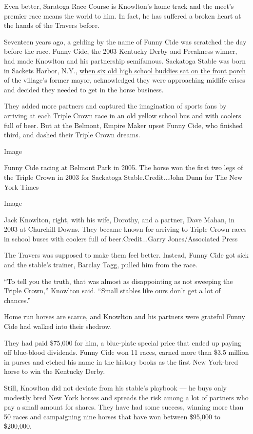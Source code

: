 Even better, Saratoga Race Course is Knowlton's home track and the
meet's premier race means the world to him. In fact, he has suffered a
broken heart at the hands of the Travers before.

Seventeen years ago, a gelding by the name of Funny Cide was scratched
the day before the race. Funny Cide, the 2003 Kentucky Derby and
Preakness winner, had made Knowlton and his partnership semifamous.
Sackatoga Stable was born in Sackets Harbor, N.Y.,
\href{https://www.nytimes.com/2003/06/02/sports/horse-racing-hicks-from-sticks-now-racing-s-elite.html}{when
six old high school buddies sat on the front porch} of the village's
former mayor, acknowledged they were approaching midlife crises and
decided they needed to get in the horse business.

They added more partners and captured the imagination of sports fans by
arriving at each Triple Crown race in an old yellow school bus and with
coolers full of beer. But at the Belmont, Empire Maker upset Funny Cide,
who finished third, and dashed their Triple Crown dreams.

Image

Funny Cide racing at Belmont Park in 2005. The horse won the first two
legs of the Triple Crown in 2003 for Sackatoga Stable.Credit...John Dunn
for The New York Times

Image

Jack Knowlton, right, with his wife, Dorothy, and a partner, Dave Mahan,
in 2003 at Churchill Downs. They became known for arriving to Triple
Crown races in school buses with coolers full of beer.Credit...Garry
Jones/Associated Press

The Travers was supposed to make them feel better. Instead, Funny Cide
got sick and the stable's trainer, Barclay Tagg, pulled him from the
race.

``To tell you the truth, that was almost as disappointing as not
sweeping the Triple Crown,'' Knowlton said. ``Small stables like ours
don't get a lot of chances.''

Home run horses are scarce, and Knowlton and his partners were grateful
Funny Cide had walked into their shedrow.

They had paid \$75,000 for him, a blue-plate special price that ended up
paying off blue-blood dividends. Funny Cide won 11 races, earned more
than \$3.5 million in purses and etched his name in the history books as
the first New York-bred horse to win the Kentucky Derby.

Still, Knowlton did not deviate from his stable's playbook --- he buys
only modestly bred New York horses and spreads the risk among a lot of
partners who pay a small amount for shares. They have had some success,
winning more than 50 races and campaigning nine horses that have won
between \$95,000 to \$200,000.

